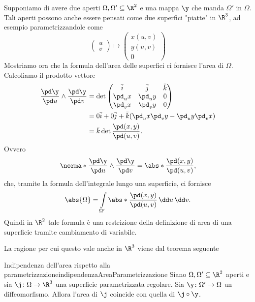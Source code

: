 Supponiamo di avere due aperti \(\Omega,\Omega'\subseteq\R^2\) e una mappa \(\y\) che manda \(\Omega'\) in \(\Omega\).
Tali aperti possono anche essere pensati come due superfici "piatte" in \(\R^3\), ad esempio parametrizzandole come
\[
	\begin{pmatrix}u\\v\end{pmatrix} \mapsto 	\begin{pmatrix}
		x(u,v) \\
		y(u,v) \\
		0
	\end{pmatrix}
\]
Mostriamo ora che la formula dell'area delle superfici ci fornisce l'area di \(\Omega\).
Calcoliamo il prodotto vettore
\[
	\begin{split}
		\frac{\pd \y}{\pd u} \wedge \frac{\pd \y}{\pd v} & = \det 	\begin{pmatrix}
			\bar{i} & \bar{j} & \bar{k} \\
			\pd_u x & \pd_u y & 0       \\
			\pd_v x & \pd_v y & 0
		\end{pmatrix}\\
		& = 0\bar{i} + 0\bar{j} + \bar{k}(\pd_u x \pd_v y - \pd_u y \pd_v x)\\
		& = \bar{k} \det \frac{\pd(x,y)}{\pd(u,v)}.
	\end{split}
\]
Ovvero
\[
	\norma*{\frac{\pd \y}{\pd u} \wedge \frac{\pd \y}{\pd v}} = \abs*{\frac{\pd(x,y)}{\pd(u,v)}},
\]
che, tramite la formula dell'integrale lungo una superficie, ci fornisce
\[
	\abs{\Omega} = \int\limits_{\Omega'} \abs*{\frac{\pd(x,y)}{\pd(u,v)}}\,\dd u\,\dd v.
\]
Quindi in \(\R^2\) tale formula è una restrizione della definizione di area di una superficie tramite cambiamento di variabile.

La ragione per cui questo vale anche in \(\R^3\) viene dal teorema seguente

\begin{teor}{Indipendenza dell'area rispetto alla parametrizzazione}{indipendenzaAreaParametrizzazione}
	Siano \(\Omega,\Omega'\subseteq\R^2\) aperti e sia \(\j\colon \Omega \to \R^3\) una superficie parametrizzata regolare.
	Sia \(\y\colon \Omega' \to \Omega\) un diffeomorfismo.
	Allora l'area di \(\j\) coincide con quella di \(\j \circ \y\).
\end{teor}

